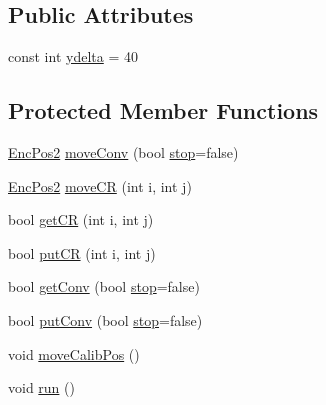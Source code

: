 \subsection*{Public Attributes}
\begin{DoxyCompactItemize}
\item 
const int \hyperlink{classft_1_1_txt_high_bay_warehouse_acfdcf3b84851e9315c7e243c8fbda76d}{ydelta} = 40
\end{DoxyCompactItemize}
\subsection*{Protected Member Functions}
\begin{DoxyCompactItemize}
\item 
\hyperlink{classft_1_1_enc_pos2}{Enc\+Pos2} \hyperlink{classft_1_1_txt_high_bay_warehouse_af3ab1d4ab7978eb08d0015d44ea288ad}{move\+Conv} (bool \hyperlink{classft_1_1_txt_high_bay_warehouse_a486b766d3f8f11a023daee496429faf0}{stop}=false)
\item 
\hyperlink{classft_1_1_enc_pos2}{Enc\+Pos2} \hyperlink{classft_1_1_txt_high_bay_warehouse_a86d585f3562c7a23c30c59d0cb483b8e}{move\+CR} (int i, int j)
\item 
bool \hyperlink{classft_1_1_txt_high_bay_warehouse_a1e19ff1c53395e93bba5bc460133cda8}{get\+CR} (int i, int j)
\item 
bool \hyperlink{classft_1_1_txt_high_bay_warehouse_a32ab3bdc96326bde4fe88c958835ada2}{put\+CR} (int i, int j)
\item 
bool \hyperlink{classft_1_1_txt_high_bay_warehouse_a8a260620bd98b4cf965084af45fe4f52}{get\+Conv} (bool \hyperlink{classft_1_1_txt_high_bay_warehouse_a486b766d3f8f11a023daee496429faf0}{stop}=false)
\item 
bool \hyperlink{classft_1_1_txt_high_bay_warehouse_afa2eedbb39e53b0063388d93abb1d481}{put\+Conv} (bool \hyperlink{classft_1_1_txt_high_bay_warehouse_a486b766d3f8f11a023daee496429faf0}{stop}=false)
\item 
void \hyperlink{classft_1_1_txt_high_bay_warehouse_a847d32417a90000d33dbec74430f7d0c}{move\+Calib\+Pos} ()
\item 
void \hyperlink{classft_1_1_txt_high_bay_warehouse_a6c734c9a8bd3bccb78fc07ee6f9433f0}{run} ()
\end{DoxyCompactItemize}
